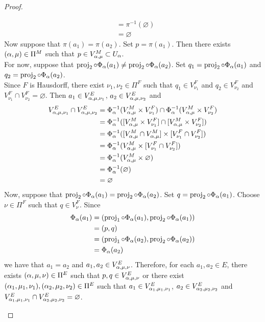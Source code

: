 \documentclass{book}
\begin{document}
\begin{proof}
\begin{enumerate}
\begin{itemize}
\begin{align*}
					& = \pi^{-1}(\varnothing) \\
					& = \varnothing
				\end{align*}  
				Now suppose that $\pi(a_1) = \pi(a_2)$. Set $p = \pi(a_1)$. Then there exists $(\alpha, \mu) \in \Pi^M$ such that $p \in V^M_{\alpha, \mu} \subset U_{\alpha}$. \\
				For now, suppose that $\operatorname{\text{proj}}_2 \circ \Phi_{\alpha}(a_1) \neq \operatorname{\text{proj}}_2 \circ \Phi_{\alpha}(a_2)$. Set $q_1 = \operatorname{\text{proj}}_2 \circ \Phi_{\alpha}(a_1)$ and  $q_2 = \operatorname{\text{proj}}_2 \circ \Phi_{\alpha}(a_2)$. \\
				Since $F$ is Hausdorff, there exist $\nu_1, \nu_2 \in \Pi^F$ such that $q_1 \in V^F_{\nu_1}$ and $q_2 \in V^F_{\nu_2}$ and $V^F_{\nu_1} \cap V^F_{\nu_2} = \varnothing$. Then $a_1 \in V^E_{\alpha, \mu, \nu_1}$, $a_2 \in V^E_{\alpha, \mu, \nu_2}$ and 
				\begin{align*}
					V^E_{\alpha, \mu, \nu_1} \cap V^E_{\alpha, \mu, \nu_2}
					& = \Phi_{\alpha}^{-1}(V^M_{\alpha, \mu} \times V^F_{\nu_1}) \cap \Phi_{\alpha}^{-1}(V^M_{\alpha, \mu} \times V^F_{\nu_2}) \\
					& = \Phi_{\alpha}^{-1}([V^M_{\alpha, \mu} \times V^F_{\nu_1}] \cap [V^M_{\alpha, \mu} \times V^F_{\nu_2}]) \\
					& = \Phi_{\alpha}^{-1}([V^M_{\alpha, \mu} \cap V^M_{\alpha, \mu} ] \times [ V^F_{\nu_1} \cap V^F_{\nu_2}]) \\
					& = \Phi_{\alpha}^{-1}(V^M_{\alpha, \mu} \times [ V^F_{\nu_1} \cap V^F_{\nu_2}]) \\
					& = \Phi_{\alpha}^{-1}(V^M_{\alpha, \mu} \times \varnothing) \\
					& = \Phi_{\alpha}^{-1}(\varnothing) \\
					& = \varnothing
				\end{align*}
				Now, suppose that $\operatorname{\text{proj}}_2 \circ \Phi_{\alpha}(a_1) = \operatorname{\text{proj}}_2 \circ \Phi_{\alpha}(a_2)$. Set $q = \operatorname{\text{proj}}_2 \circ \Phi_{\alpha}(a_1)$. Choose $\nu \in \Pi^F$ such that $q \in V^F_{\nu}$. Since
				\begin{align*}
					\Phi_{\alpha}(a_1) 
					& = (\operatorname{\text{proj}}_1 \circ \Phi_{\alpha}(a_1), \operatorname{\text{proj}}_2 \circ \Phi_{\alpha}(a_1)) \\
					& = (p, q) \\
					& = (\operatorname{\text{proj}}_1 \circ \Phi_{\alpha}(a_2), \operatorname{\text{proj}}_2 \circ \Phi_{\alpha}(a_2)) \\
					& = \Phi_{\alpha}(a_2) 
				\end{align*}
				we have that $a_1 = a_2$ and $a_1, a_2 \in V^E_{\alpha, \mu, \nu}$. 
				Therefore, for each $a_1,a_2 \in E$, there exists $(\alpha, \mu, \nu) \in \Pi^E$ such that $p,q \in V^E_{\alpha, \mu, \nu}$ or there exist $(\alpha_1, \mu_1, \nu_1), (\alpha_2, \mu_2, \nu_2) \in \Pi^E$ such that $a_1 \in V^E_{\alpha_1, \mu_1, \nu_1}$, $a_2 \in V^E_{\alpha_2, \mu_2, \nu_2}$ and $V^E_{\alpha_1, \mu_1, \nu_1} \cap V^E_{\alpha_2, \mu_2, \nu_2} = \varnothing$.

\end{itemize}
\end{enumerate}
\end{proof}
\end{document}
